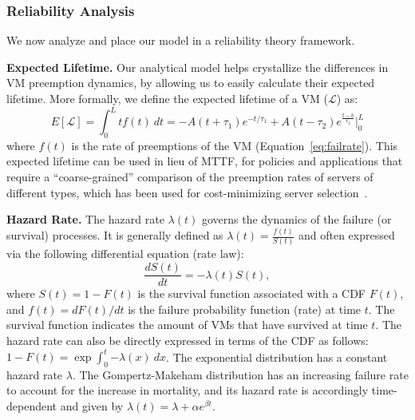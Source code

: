 
\subsubsection{Reliability Analysis}
\label{subsec:reliability}

We now analyze and place our model in a reliability theory framework. 
%

\noindent \textbf{Expected Lifetime.} Our analytical model helps crystallize the differences in VM preemption dynamics, by allowing us to easily calculate their expected lifetime. 
More formally, we define the expected lifetime of a VM ($\mathscr{L}$) as: 
\begin{equation}
  \label{eq:expected-lifetime}
E[\mathscr{L}] =  \int_{0}^{L} t {f}(t)~dt =  -A(t+\tau_1)e^{-t/\tau_1} + A(t-\tau_2) e^{\frac{t-b}{\tau_2}} \biggr\rvert_{0}^{L}
\end{equation}
where $f(t)$ is the rate of preemptions of the VM (Equation~\ref{eq:failrate}).
%
%
This expected lifetime can be used in lieu of MTTF, for policies and applications that require a ``coarse-grained'' comparison of the preemption rates of servers of different types, which has been used for cost-minimizing server selection~\cite{flint}. 


\noindent \textbf{Hazard Rate.}
The hazard rate $\lambda(t)$ governs the dynamics of the failure (or survival) processes. It is generally defined as $\lambda(t) = \frac{f(t)}{S(t)}$ and often expressed via the following differential equation (rate law):
\begin{equation}\label{eq:hazard}
\frac{dS(t)}{dt} = -\lambda(t) S(t),
\end{equation}
where $S(t) = 1 - F(t)$ is the survival function associated with a CDF $F(t)$, and $f(t)=dF(t)/dt$ is the failure probability function (rate) at time $t$. The survival function indicates the amount of VMs that have survived at time $t$.
The hazard rate can also be directly expressed in terms of the CDF as follows: $1-F(t) = \exp{\int_0^t{-\lambda(x) ~dx}}$. 
The exponential distribution has a constant hazard rate $\lambda$.
The Gompertz-Makeham distribution has an increasing failure rate to account for the increase in mortality, and its hazard rate is accordingly time-dependent and given by $\lambda(t) = \lambda + \alpha e^{\beta t}$.

